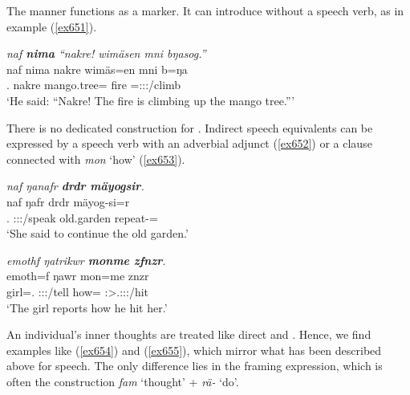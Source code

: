 The manner  functions as a  marker. It can introduce  without a speech verb, as in example (\ref{ex651}).

\begin{exe}
	\ex \emph{naf \textbf{nima} ``nakre! wimäsen mni bŋasog.''}\\
	\gll naf nima nakre wimäs=en mni b=ŋa\\
	\Tsg.{\Erg} {\Quot} nakre {mango.tree}={\Loc} fire \Med=\Stsg:\Sbj:\Nonpast:\Ipfv/climb\\
	\trans `He said: ``Nakre! The fire is climbing up the mango tree.'''\\
	\label{ex651}
\end{exe}

There is no dedicated construction for . Indirect speech equivalents can be expressed by a speech verb with an adverbial adjunct (\ref{ex652}) or a clause connected with \emph{mon} `how' (\ref{ex653}).

\begin{exe}
	\ex \emph{naf ŋanafr \textbf{drdr mäyogsir}.}\\
	\gll naf ŋafr drdr mäyog-si=r\\
	\Tsg.{\Erg} \Stsg:\Sbj:\Nonpast:\Ipfv/speak old.garden repeat-\Nmlz=\Purp\\
	\trans `She said to continue the old garden.'
	\label{ex652}
\end{exe}
\begin{exe}
	\ex \emph{emothf ŋatrikwr \textbf{monme zfnzr}.}\\
	\gll emoth=f ŋawr mon=me znzr\\
	girl=\Erg.{\Sg} \Stsg:\Sbj:\Nonpast:\Ipfv/tell how={\Ins} \Stsg:\Sbj>\Tsg.\F:\Obj:\Pst:\Ipfv/hit\\
	\trans `The girl reports how he hit her.'
	\label{ex653}
\end{exe}

An individual's inner thoughts are treated like direct and . Hence, we find examples like (\ref{ex654}) and (\ref{ex655}), which mirror what has been described above for speech. The only difference lies in the framing expression, which is often the  construction \emph{fam} `thought' + \emph{rä-} `do'.

